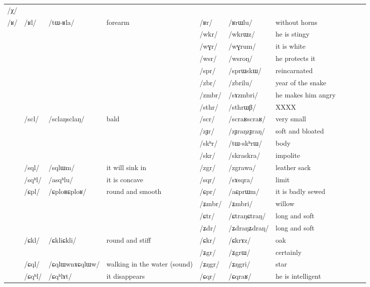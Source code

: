 \documentclass[oldfontcommands,oneside,a4paper,11pt]{article}
\newcommand{\ipa}[1]{/#1/} %
\newcommand{\deux}[1]{/#1/}
\newcommand{\trois}[1]{/#1/}
\newcommand{\tib}[1]{\cellcolor{lightgray}\textbf{#1}}
\newcommand{\idph}[1]{\cellcolor{gray}\textbf{#1}}
\begin{document}
\begin{table}
{\begin{tabular}{l|lll|lll|lll|l}
\ipa{χ} 	&  	&  	&  	&  	&  	& \\	
\ipa{ʁ} 	& \deux{ʁl} 	& \ipa{tɯ-ʁla} 	& forearm 	& \deux{ʁr} 	& \ipa{ʁrɯlu} 	& without horns\\	
\midrule							
	&	&	&	&\trois{wkr}  	& \ipa{wkrɯz}  	&he is stingy \\	
	&	&	&	&\trois{wɣr}  	&\ipa{wɣrum}  	&it is white\\	
	&	&	&  	&\trois{wsr}  	&\ipa{wsroŋ}  	&he protects it\\	
\midrule							
	&	&	&	&\trois{spr}  	& \ipa{sprɯskɯ}  	&  reincarnated\\	
	&	&	&	&\trois{zbr}  \tib{} 	& \ipa{zbrilu}  	& year of the snake \\	
	&	&	&	&\trois{zmbr}  	& \ipa{sɤzmbri}  	& he makes him angry\\	
	&	&	&	&\trois{sthr}  \idph{} 	& \ipa{sthrɯβ}  	& XXXX\\	
	&\trois{scl}  \idph{}	& \ipa{sclaŋsclaŋ}  	& bald	&\trois{scr}  \idph{}	& \ipa{scraʁscraʁ}  	& very small	&\\
	&	&	&	&\trois{zɟr} \idph{} 	& \ipa{zɟraŋzɟraŋ}  	& soft and bloated\\	
	&	&	&	&\trois{skʰr}  	& \ipa{tɯ-skʰrɯ}  	& body \\	
	&	&	&	&\trois{skr}  	& \ipa{skraskra}  	& impolite \\	
	&\trois{sql}  	& \ipa{sqlɯm}  	&it will sink in 	&\trois{zgr} \tib{} 	& \ipa{zgrawa}    	&leather sack\\	
	&\trois{sqʰl}  	& \ipa{asqʰlu}  	&it is concave 	&\trois{sqr}  	& \ipa{sɤsqra}   	&limit\\	
\midrule							
	&\trois{ɕpl}	&\ipa{ɕploʁɕploʁ}	&round and smooth	&\trois{ɕpr}  	& \ipa{aɕprɯm}  	& it is badly sewed\\	
	&	&	&	&\trois{ʑmbr}  	& \ipa{ʑmbri}  	& willow\\	
	&	&	&	&\trois{ɕtr}  \idph{}	& \ipa{ɕtraŋɕtraŋ}  	& long and soft\\	
	&	&	&	&\trois{ʑdr}  \idph{}	& \ipa{ʑdraŋʑdraŋ}  	&  long and soft\\	
	&\trois{ɕkl}	&\ipa{ɕkliɕkli}	&round and stiff	&\trois{ɕkr}  	& \ipa{ɕkrɤz}  	&oak \\	
	&	&	&	&\trois{ʑgr}  	& \ipa{ʑgrɯ}  	&certainly \\	
	&\trois{ɕql}  \idph{}	& \ipa{ɕqlɯwnɤɕqlɯw}  	&  walking in the water (sound)	&\trois{ʑŋgr}  	& \ipa{ʑŋgri}  	&star \\	
	&\trois{ɕqʰl}  	& \ipa{ɕqʰlɤt}  	&it disappears 	&\trois{ɕqr}  	& \ipa{ɕqraʁ}  	& he is intelligent \\	

\end{tabular}}
\end{table}
\end{document}
